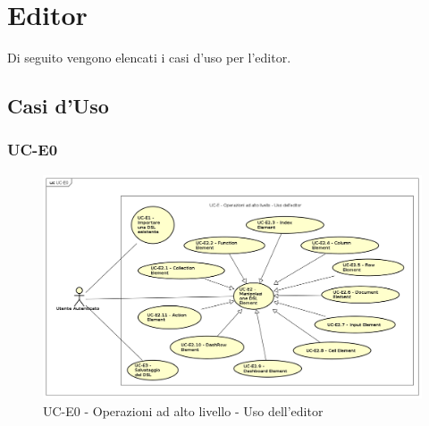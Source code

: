 \section{Editor}

Di seguito vengono elencati i casi d'uso per l'editor.

\subsection{Casi d'Uso}


\subsubsection{UC-E0}

    \begin{figure}[H]
      \begin{center}
        \includegraphics[width=12cm]{res/img/UCEditor/UC-E0.png}
      \caption{UC-E0 - Operazioni ad alto livello - Uso dell'editor}
      \end{center} 
    \end{figure}    
    

